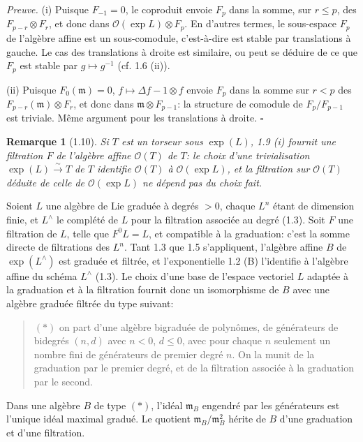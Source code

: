 \documentclass[10pt,a4paper]{article}
\newcommand{\OO}{\mathcal O}
\newcommand{\m}{\mathfrak m}
\newcommand{\Lhat}{L^{\wedge}}
\theoremstyle{deligne}
\newtheorem*{remark*}{Remarque}
\newenvironment{proofdel}{\textit{Preuve.}}{\hfill$\square$}
\newcommand{\heading}[1]{\vspace{0.65em}\noindent{\bfseries #1}\quad}
\begin{document}
\begin{proofdel}
(i) Puisque \(F_{-1}=0\), le coproduit envoie \(F_p\) dans la somme, sur \(r\le p\), des \(F_{p-r}\otimes F_r\), et donc dans \(\OO(\exp L)\otimes F_p\). En d'autres termes, le sous-espace \(F_p\) de l'algèbre affine est un sous-comodule, c'est-à-dire est stable par translations à gauche. Le cas des translations à droite est similaire, ou peut se déduire de ce que \(F_p\) est stable par \(g\mapsto g^{-1}\) (cf. 1.6 (ii)).

(ii) Puisque \(F_0(\m)=0\), \(f\mapsto\Delta f-1\otimes f\) envoie \(F_p\) dans la somme sur \(r<p\) des \(F_{p-r}(\m)\otimes F_r\), et donc dans \(\m\otimes F_{p-1}\): la structure de comodule de \(F_p/F_{p-1}\) est triviale. Même argument pour les translations à droite.
\end{proofdel}

\begin{remark*}[1.10]
Si \(T\) est un torseur sous \(\exp(L)\), 1.9 (i) fournit une filtration \(F\) de l'algèbre affine \(\OO(T)\) de \(T\): le choix d'une trivialisation \(\exp(L)\overset{\sim}{\to}T\) de \(T\) identifie \(\OO(T)\) à \(\OO(\exp L)\), et la filtration sur \(\OO(T)\) déduite de celle de \(\OO(\exp L)\) ne dépend pas du choix fait.
\end{remark*}

\heading{1.11.} Soient \(L\) une algèbre de Lie graduée à degrés \(>0\), chaque \(L^n\) étant de dimension finie, et \(\Lhat\) le complété de \(L\) pour la filtration associée au degré (1.3). Soit \(F\) une filtration de \(L\), telle que \(F^0L=L\), et compatible à la graduation: c'est la somme directe de filtrations des \(L^n\). Tant 1.3 que 1.5 s'appliquent, l'algèbre affine \(B\) de \(\exp(\Lhat)\) est graduée et filtrée, et l'exponentielle 1.2 (B) l'identifie à l'algèbre affine du schéma \(\Lhat\) (1.3). Le choix d'une base de l'espace vectoriel \(L\) adaptée à la graduation et à la filtration fournit donc un isomorphisme de \(B\) avec une algèbre graduée filtrée du type suivant:

\begin{quote}
\((*)\) on part d'une algèbre bigraduée de polynômes, de générateurs de bidegrés \((n,d)\) avec \(n<0\), \(d\le0\), avec pour chaque \(n\) seulement un nombre fini de générateurs de premier degré \(n\). On la munit de la graduation par le premier degré, et de la filtration associée à la graduation par le second.
\end{quote}

Dans une algèbre \(B\) de type \((*)\), l'idéal \(\m_B\) engendré par les générateurs est l'unique idéal maximal gradué. Le quotient \(\m_B/\m_B^2\) hérite de \(B\) d'une graduation et d'une filtration.
\end{document}

